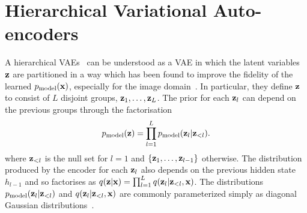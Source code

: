 \section{Hierarchical Variational Auto-encoders} \label{sec:hierarchical-vae}
A hierarchical
VAEs~\citep{gregor2015draw,kingma2016improving,sonderby2016ladder,klushyn2019learning} can be understood as a VAE in which the latent variables ${\mathbf{z}}$ are partitioned in a way which has been found to improve the
fidelity of the learned $p_{\rm{model}}{}(\mathbf{x}{})$, especially for the image
domain~\citep{vahdat2020nvae,child2020very}. In particular, they define ${\mathbf{z}}$ to
consist of $L$ disjoint groups, ${\mathbf{z}}_1,\ldots,{\mathbf{z}}_L$. The prior for each ${\mathbf{z}}_l$ can
depend on the previous groups through the factorisation
\begin{equation}
  \label{eq:hierarchical-prior}
  p_{\rm{model}}{}(\mathbf{z}{}) = \prod_{l=1}^L p_{\rm{model}}{}(\mathbf{z}{}_l|\mathbf{z}{}_{<l}).
\end{equation}
where $\mathbf{z}{}_{<l}$ is the null set for $l=1$ and $\{\mathbf{z}{}_1,\ldots,\mathbf{z}{}_{l-1}\}$
otherwise. The distribution
produced by the encoder for each $\mathbf{z}{}_l$ also depends on the previous hidden
state $h_{l-1}$ and so factorises as
$q(\mathbf{z}{}|\mathbf{x}{}) = \prod_{l=1}^L q(\mathbf{z}{}_l|\mathbf{z}{}_{<l}, \mathbf{x}{})$. The distributions
$p_{\rm{model}}{}(\mathbf{z}{}_l|\mathbf{z}{}_{<l})$ and $q(\mathbf{z}{}_l|\mathbf{z}{}_{<l}, \mathbf{x}{})$ are commonly parameterized simply as diagonal
Gaussian distributions~\citep{sonderby2016ladder,vahdat2020nvae,child2020very}.

